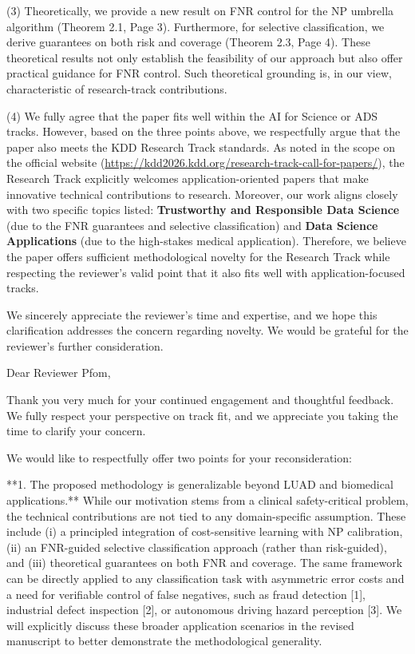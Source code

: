 \documentclass[UTF8,12pt]{article}
\begin{document}
(3) Theoretically, we provide a new result on FNR control for the NP umbrella algorithm (Theorem 2.1, Page 3). Furthermore, for selective classification, we derive guarantees on both risk and coverage (Theorem 2.3, Page 4). These theoretical results not only establish the feasibility of our approach but also offer practical guidance for FNR control. Such theoretical grounding is, in our view, characteristic of research-track contributions.

(4) We fully agree that the paper fits well within the AI for Science or ADS tracks. However, based on the three points above, we respectfully argue that the paper also meets the KDD Research Track standards. As noted in the scope on the official website (\url{https://kdd2026.kdd.org/research-track-call-for-papers/}), the Research Track explicitly welcomes application-oriented papers that make innovative technical contributions to research. Moreover, our work aligns closely with two specific topics listed: \textbf{Trustworthy and Responsible Data Science} (due to the FNR guarantees and selective classification) and \textbf{Data Science Applications} (due to the high-stakes medical application). Therefore, we believe the paper offers sufficient methodological novelty for the Research Track while respecting the reviewer’s valid point that it also fits well with application-focused tracks.

We sincerely appreciate the reviewer’s time and expertise, and we hope this clarification addresses the concern regarding novelty. We would be grateful for the reviewer’s further consideration.

\newpage
Dear Reviewer Pfom,

Thank you very much for your continued engagement and thoughtful feedback. We fully respect your perspective on track fit, and we appreciate you taking the time to clarify your concern.

We would like to respectfully offer two points for your reconsideration:

**1. The proposed methodology is generalizable beyond LUAD and biomedical applications.**  
While our motivation stems from a clinical safety-critical problem, the technical contributions are not tied to any domain-specific assumption. These include (i) a principled integration of cost-sensitive learning with NP calibration, (ii) an FNR-guided selective classification approach (rather than risk-guided), and (iii) theoretical guarantees on both FNR and coverage. The same framework can be directly applied to any classification task with asymmetric error costs and a need for verifiable control of false negatives, such as fraud detection [1], industrial defect inspection [2], or autonomous driving hazard perception [3]. We will explicitly discuss these broader application scenarios in the revised manuscript to better demonstrate the methodological generality.
\end{document}
